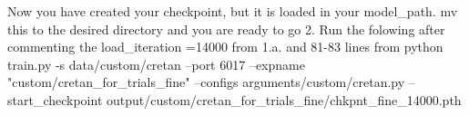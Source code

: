 Now you have created your checkpoint, but it is loaded in your model_path.
mv this to the desired directory and you are ready to go
2. Run the folowing after commenting the load_iteration =14000 from 1.a. and 81-83 lines 
from %
python train.py -s data/custom/cretan --port 6017 --expname "custom/cretan_for_trials_fine" --configs arguments/custom/cretan.py --start_checkpoint output/custom/cretan_for_trials_fine/chkpnt_fine_14000.pth

